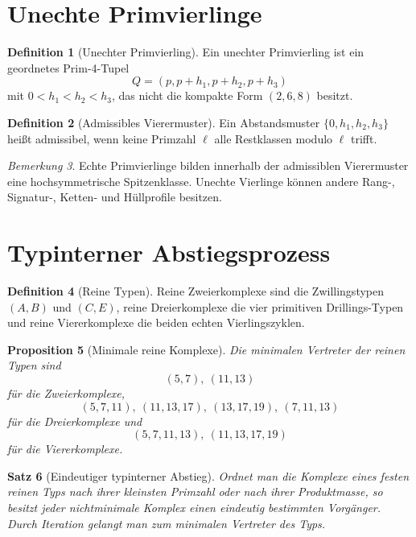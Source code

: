 \documentclass[12pt,a4paper]{article}
\newtheorem{satz}{Satz}[section]
\newtheorem{proposition}[satz]{Proposition}
\theoremstyle{definition}
\newtheorem{definition}[satz]{Definition}
\theoremstyle{remark}
\newtheorem{bemerkung}[satz]{Bemerkung}
\begin{document}
	\section{Unechte Primvierlinge}
	
	\begin{definition}[Unechter Primvierling]
		Ein unechter Primvierling ist ein geordnetes Prim-4-Tupel
		\[
		Q=(p,p+h_1,p+h_2,p+h_3)
		\]
		mit \(0<h_1<h_2<h_3\), das nicht die kompakte Form \((2,6,8)\) besitzt.
	\end{definition}
	
	\begin{definition}[Admissibles Vierermuster]
		Ein Abstandsmuster \(\{0,h_1,h_2,h_3\}\) heißt admissibel, wenn keine Primzahl \(\ell\) alle Restklassen modulo \(\ell\) trifft.
	\end{definition}
	
	\begin{bemerkung}
		Echte Primvierlinge bilden innerhalb der admissiblen Vierermuster eine hochsymmetrische Spitzenklasse. Unechte Vierlinge können andere Rang-, Signatur-, Ketten- und Hüllprofile besitzen.
	\end{bemerkung}
	
	\section{Typinterner Abstiegsprozess}
	
	\begin{definition}[Reine Typen]
		Reine Zweierkomplexe sind die Zwillingstypen \((A,B)\) und \((C,E)\), reine Dreierkomplexe die vier primitiven Drillings-Typen und reine Viererkomplexe die beiden echten Vierlingszyklen.
	\end{definition}
	
	\begin{proposition}[Minimale reine Komplexe]
		Die minimalen Vertreter der reinen Typen sind
		\[
		(5,7),\ (11,13)
		\]
		für die Zweierkomplexe,
		\[
		(5,7,11),\ (11,13,17),\ (13,17,19),\ (7,11,13)
		\]
		für die Dreierkomplexe und
		\[
		(5,7,11,13),\ (11,13,17,19)
		\]
		für die Viererkomplexe.
	\end{proposition}
	
	\begin{satz}[Eindeutiger typinterner Abstieg]
		Ordnet man die Komplexe eines festen reinen Typs nach ihrer kleinsten Primzahl oder nach ihrer Produktmasse, so besitzt jeder nichtminimale Komplex einen eindeutig bestimmten Vorgänger. Durch Iteration gelangt man zum minimalen Vertreter des Typs.
	\end{satz}
	
\end{document}
